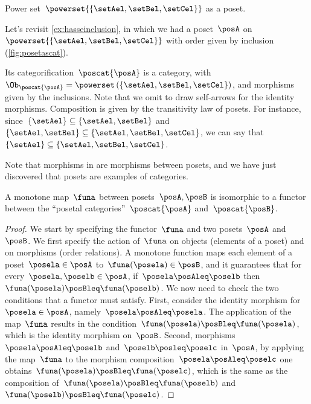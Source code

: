 \begin{marginfigure}
    \centering
    \caption{Power set~$\powerset{\{\setAel,\setBel,\setCel\}}$ as a poset. \label{fig:posetascat}}
\end{marginfigure}

\begin{example}
    Let's revisit \cref{ex:hasseinclusion}, in which we had a poset~$\posA$ on~$\powerset{\{\setAel,\setBel,\setCel\}}$ with order given by inclusion (\cref{fig:posetascat}).

    Its categorification~$\poscat{\posA}$ is a category, with~$\Ob_{\poscat{\posA}}=\powerset\left(\{\setAel,\setBel,\setCel\}\right)$, and morphisms given by the inclusions.
    Note that we omit to draw self-arrows for the identity morphisms.
    Composition is given by the transitivity law of posets.
    For instance, since~$\{\setAel\}\subseteq \{\setAel,\setBel\}$ and~$\{\setAel,\setBel\} \subseteq \{\setAel,\setBel,\setCel\}$, we can say that~$\{\setAel\}\subseteq \{\setAel,\setBel,\setCel\}$.
\end{example}



Note that morphisms in \Pos are morphisms between posets, and we have just discovered that posets are examples of categories.
\begin{lemma}
    \label{lem:posetfunctor}
    A monotone map~$\funa$ between posets~$\posA,\posB$ is isomorphic to a functor between the ``posetal categories''~$\poscat{\posA}$ and~$\poscat{\posB}$.
\end{lemma}
\begin{proof}
    We start by specifying the functor~$\funa$ and two posets~$\posA$ and~$\posB$.
    We first specify the action of~$\funa$ on objects (elements of a poset) and on morphisms (order relations).
    A monotone function maps each element of a poset~$\posela\in \posA$ to~$\funa(\posela) \in \posB$, and it guarantees that for every~$\posela,\poselb\in \posA$, if~$\posela\posAleq \poselb$ then~$\funa(\posela)\posBleq \funa(\poselb)$.
    We now need to check the two conditions that a functor must satisfy.
    First, consider the identity morphism for~$\posela\in \posA$, namely~$\posela \posAleq \posela$.
    The application of the map~$\funa$ results in the condition~$\funa(\posela)\posBleq \funa(\posela)$, which is the identity morphism on~$\posB$.
    Second, morphisms~$\posela\posAleq \poselb$ and~$\poselb\posleq \poselc$ in~$\posA$, by applying the map~$\funa$ to the morphism composition~$\posela\posAleq \poselc$ one obtains~$\funa(\posela)\posBleq \funa(\poselc)$, which is the same as the composition of~$\funa(\posela)\posBleq \funa(\poselb)$ and~$\funa(\poselb)\posBleq \funa(\poselc)$.
\end{proof}

